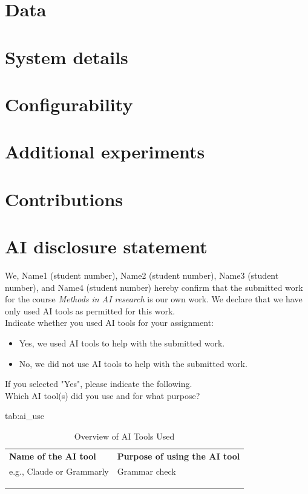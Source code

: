 \documentclass{midl} %
\begin{document}
\appendix

\section{Data}

\section{System details}


\section{Configurability}

\section{Additional experiments}

\section{Contributions}

\section{AI disclosure statement}
We, Name1 (student number), Name2 (student number), Name3 (student number), and Name4 (student number) hereby confirm that the submitted work for the course \textit{Methods in AI research} is our own work. We declare that we have only used AI tools as permitted for this work. \\

\noindent Indicate whether you used AI tools for your assignment:
\begin{itemize}
    \item Yes, we used AI tools to help with the submitted work.
    \item No, we did not use AI tools to help with the submitted work.
\end{itemize}

\noindent If you selected "Yes", please indicate the following.\\

\noindent Which AI tool(s) did you use and for what purpose?

\begin{table}[htbp]
\floatconts
  {tab:ai_use}%
  {\caption{Overview of AI Tools Used}}%
  {\begin{tabular}{ll}
  \bfseries Name of the AI tool & \bfseries Purpose of using the AI tool\\
  e.g., Claude or Grammarly & Grammar check \\
   & \\
   & \\
   & \\

  \end{tabular}}
\end{table}
\end{document}
